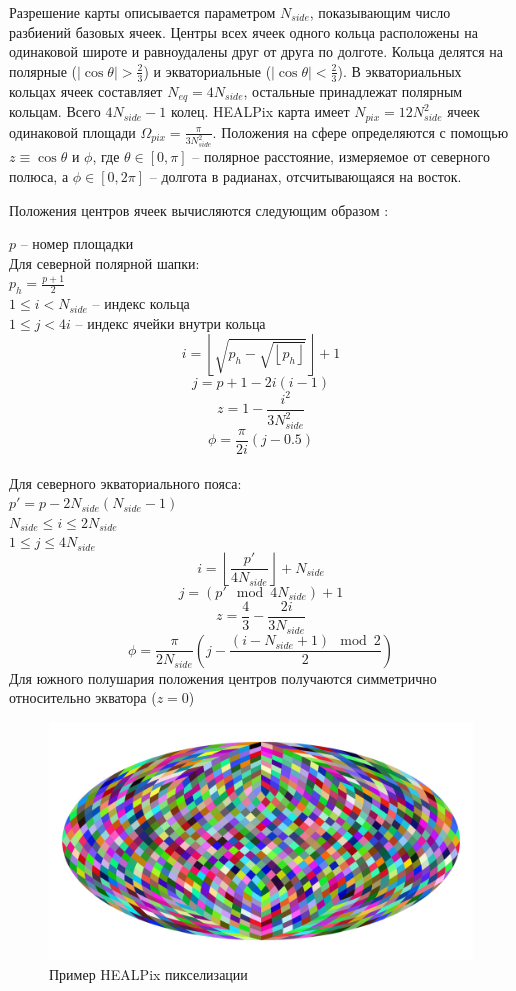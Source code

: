 \documentclass[14pt]{article} %
\begin{document}
Разрешение карты описывается параметром $N_{side}$, показывающим число разбиений базовых ячеек. Центры всех ячеек одного кольца расположены на одинаковой широте и равноудалены друг от друга по долготе. Кольца делятся на полярные ($\left|\cos\theta\right|>\frac{2}{3}$) и экваториальные ($\left|\cos\theta\right|<\frac{2}{3}$). В экваториальных кольцах ячеек составляет $N_{eq}=4N_{side}$, остальные принадлежат полярным кольцам. Всего $4N_{side}-1$ колец.
HEALPix карта имеет $N_{pix}=12N_{side}^2$ ячеек одинаковой площади $\Omega_{pix}=\frac{\pi}{3N_{side}^2}$.
Положения на сфере определяются с помощью $z \equiv \cos\theta$ и $\phi$, где $\theta \in \left[0,\pi\right]$ -- полярное расстояние, измеряемое от северного полюса, а $\phi \in\left[0,2\pi\right]$ -- долгота в радианах, отсчитывающаяся на восток.

Положения центров ячеек вычисляются следующим образом \citep{2005ApJ...622..759G}:

$p$ -- номер площадки\\
Для северной полярной шапки:\\
$p_h=\frac{p+1}{2}$\\
$1\le i<N_{side}$ -- индекс кольца\\
$1\le j<4i$ -- индекс ячейки внутри кольца\\
$$i=\left\lfloor\sqrt{p_h-\sqrt{\left\lfloor p_h\right\rfloor}}\right\rfloor+1$$
$$j=p+1-2i\left(i-1\right)$$
$$z=1-\frac{i^2}{3N_{side}^2}$$
$$\phi=\frac{\pi}{2i}\left(j-0.5\right)$$\\
Для северного экваториального пояса:\\
$p'=p-2N_{side}\left(N_{side}-1\right)$\\
$N_{side}\le i\le 2N_{side}$\\
$1\le j\le 4N_{side}$
$$i=\left\lfloor\frac{p'}{4N_{side}}\right\rfloor + N_{side}$$
$$j=(p' \mod 4N_{side}) +1$$
$$z=\frac{4}{3}-\frac{2i}{3N_{side}}$$
$$\phi=\frac{\pi}{2N_{side}}\left(j-\frac{\left(i-N_{side}+1\right)\mod 2}{2}\right)$$
Для южного полушария положения центров получаются симметрично относительно экватора ($z=0$) 
\begin{figure}[h!]
\includegraphics[width=1\linewidth]{healpexample.jpg}
\caption*{Пример HEALPix пикселизации}
\end{figure}
\newpage
\end{document}
